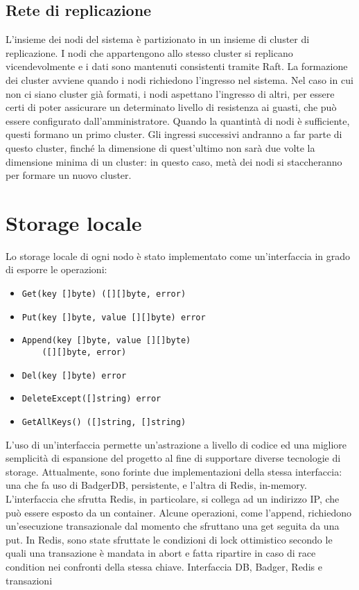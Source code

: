 \documentclass[conference]{IEEEtran}
\begin{document}
\subsection{Rete di replicazione}
L'insieme dei nodi del sistema è partizionato in un insieme di cluster di replicazione. I nodi che appartengono allo
stesso cluster si replicano vicendevolmente e i dati sono mantenuti consistenti tramite Raft. La formazione dei cluster
avviene quando i nodi richiedono l'ingresso nel sistema. Nel caso in cui non ci siano cluster già formati, i nodi aspettano
l'ingresso di altri, per essere certi di poter assicurare un determinato livello di resistenza ai guasti, che può essere
configurato dall'amministratore. Quando la quantintà di nodi è sufficiente, questi formano un primo cluster. Gli ingressi successivi
andranno a far parte di questo cluster, finché la dimensione di quest'ultimo non sarà due volte la dimensione minima di un
cluster: in questo caso, metà dei nodi si staccheranno per formare un nuovo cluster.

\section{Storage locale}
Lo storage locale di ogni nodo è stato implementato come un'interfaccia in grado di esporre le operazioni:
\begin{itemize}
  \item {\small{\verb!Get(key []byte) ([][]byte, error)!}}
  \item {\small{\verb!Put(key []byte, value [][]byte) error!}}
  \item {\small{\verb!Append(key []byte, value [][]byte)!\\ \verb!    ([][]byte, error)!}}
  \item {\small{\verb!Del(key []byte) error!}}
  \item {\small{\verb!DeleteExcept([]string) error!}}
  \item {\small{\verb!GetAllKeys() ([]string, []string)!}}
\end{itemize}
L'uso di un'interfaccia permette un'astrazione a livello di codice ed una migliore semplicità di espansione del progetto
al fine di supportare diverse tecnologie di storage. Attualmente, sono forinte due implementazioni della stessa interfaccia:
una che fa uso di BadgerDB, persistente, e l'altra di Redis, in-memory. L'interfaccia che sfrutta Redis, in particolare, si collega ad un indirizzo
IP, che può essere esposto da un container. Alcune operazioni, come l'append, richiedono un'esecuzione transazionale dal
momento che sfruttano una get seguita da una put. In Redis, sono state sfruttate le condizioni di lock ottimistico secondo
le quali una transazione è mandata in abort e fatta ripartire in caso di race condition nei confronti della stessa chiave.
Interfaccia DB, Badger, Redis e transazioni
\end{document}
